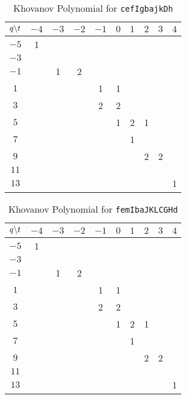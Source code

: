 \documentclass{article}
\theoremstyle{plain}
\begin{document}
        \begin{table}[H]
            \centering
            \begin{tabular}{| c | c | c | c | c | c | c | c | c | c |}
                \hline
                $q\symbol{92}t$&$-4$&$-3$&$-2$&$-1$&$0$&$1$&$2$&$3$&$4$\\
                \hline
                $-5$&1&&&&&&&&\\
                \hline
                $-3$&&&&&&&&&\\
                \hline
                $-1$&&1&2&&&&&&\\
                \hline
                $1$&&&&1&1&&&&\\
                \hline
                $3$&&&&2&2&&&&\\
                \hline
                $5$&&&&&1&2&1&&\\
                \hline
                $7$&&&&&&1&&&\\
                \hline
                $9$&&&&&&&2&2&\\
                \hline
                $11$&&&&&&&&&\\
                \hline
                $13$&&&&&&&&&1\\
                \hline
            \end{tabular}
            \caption{Khovanov Polynomial for \texttt{cefIgbajkDh}}
            \label{table:cefIgbajkDh_kho}
        \end{table}
        \begin{table}[H]
            \centering
            \begin{tabular}{| c | c | c | c | c | c | c | c | c | c |}
                \hline
                $q\symbol{92}t$&$-4$&$-3$&$-2$&$-1$&$0$&$1$&$2$&$3$&$4$\\
                \hline
                $-5$&1&&&&&&&&\\
                \hline
                $-3$&&&&&&&&&\\
                \hline
                $-1$&&1&2&&&&&&\\
                \hline
                $1$&&&&1&1&&&&\\
                \hline
                $3$&&&&2&2&&&&\\
                \hline
                $5$&&&&&1&2&1&&\\
                \hline
                $7$&&&&&&1&&&\\
                \hline
                $9$&&&&&&&2&2&\\
                \hline
                $11$&&&&&&&&&\\
                \hline
                $13$&&&&&&&&&1\\
                \hline
            \end{tabular}
            \caption{Khovanov Polynomial for \texttt{femIbaJKLCGHd}}
            \label{table:femIbaJKLCGHd_kho}
        \end{table}
\end{document}
